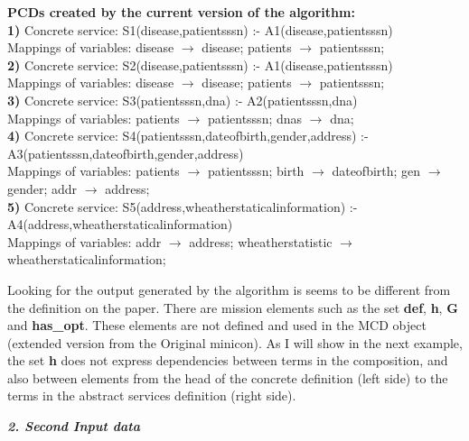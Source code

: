 \documentclass[12pt,a4paper,oneside]{report}
\begin{document}
\begin{flushleft}
\textbf{PCDs created by the current version of the algorithm:} \\
\textbf{1)} Concrete service: S1(disease,patientsssn) :- A1(disease,patientsssn) \\
Mappings of variables: disease $\longrightarrow$ disease; patients $\longrightarrow$ patientsssn; \\

\textbf{2)} Concrete service: S2(disease,patientsssn) :- A1(disease,patientsssn) \\
Mappings of variables: disease $\longrightarrow$ disease; patients $\longrightarrow$ patientsssn; \\

\textbf{3)} Concrete service: S3(patientsssn,dna) :- A2(patientsssn,dna) \\
Mappings of variables: patients $\longrightarrow$ patientsssn; dnas $\longrightarrow$ dna; \\

\textbf{4)} Concrete service: S4(patientsssn,dateofbirth,gender,address) :- A3(patientsssn,dateofbirth,gender,address) \\
Mappings of variables: patients $\longrightarrow$ patientsssn; birth $\longrightarrow$ dateofbirth; gen $\longrightarrow$ gender; addr $\longrightarrow$ address; \\

\textbf{5)} Concrete service: S5(address,wheatherstaticalinformation) :- A4(address,wheatherstaticalinformation) \\
Mappings of variables: addr $\longrightarrow$ address; wheatherstatistic $\longrightarrow$ wheatherstaticalinformation; 
\end{flushleft}

Looking for the output generated by the algorithm is seems to be different from the definition on the paper. There are mission elements such as the set \textbf{def}, \textbf{h}, \textbf{G} and \textbf{has\_opt}. These elements are not defined and used in the MCD object (extended version from the Original minicon). As I will show in the next example, the set \textbf{h} does not express dependencies between terms in the composition, and also between elements from the head of the concrete definition (left side) to the terms in the abstract services definition (right side).

\begin{flushleft}
\textsl{\textbf{ 2. Second Input data}}
\end{flushleft}
\end{document}
